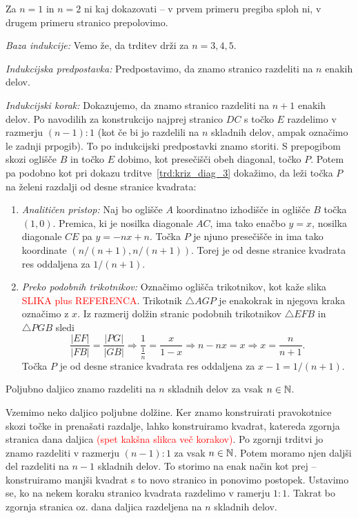 \begin{dokaz}
    Za $n = 1$ in $n = 2$ ni kaj dokazovati -- v prvem primeru pregiba sploh ni, v drugem primeru stranico prepolovimo.

    \textit{Baza indukcije:} Vemo že, da trditev drži za $n = 3, 4, 5$.

    \textit{Indukcijska predpostavka:} Predpostavimo, da znamo stranico razdeliti na $n$ enakih delov.

    \textit{Indukcijski korak:} Dokazujemo, da znamo stranico razdeliti na $n+1$ enakih delov. Po navodilih za konstrukcijo najprej stranico $DC$ s točko $E$ razdelimo v razmerju $(n-1):1$ (kot če bi jo razdelili na $n$ skladnih delov, ampak označimo le zadnji prpogib). To po indukcijski predpostavki znamo storiti. S prepogibom skozi oglišče $B$ in točko $E$ dobimo, kot presečišči obeh diagonal, točko $P$. Potem pa podobno kot pri dokazu trditve~\ref{trd:kriz_diag_3} dokažimo, da leži točka $P$ na želeni razdalji od desne stranice kvadrata:
    \begin{enumerate}
        \item \textit{Analitičen pristop:} Naj bo oglišče $A$ koordinatno izhodišče in oglišče $B$ točka $(1, 0)$. Premica, ki je nosilka diagonale $AC$, ima tako enačbo $y = x$, nosilka diagonale $CE$ pa $y = -nx + n$. Točka $P$ je njuno presečišče in ima tako koordinate $(n/(n+1), n/(n+1))$. Torej je od desne stranice kvadrata res oddaljena za $1/(n+1)$.
        \item \textit{Preko podobnih trikotnikov:} Označimo oglišča trikotnikov, kot kaže slika \textcolor{red}{SLIKA plus REFERENCA}. Trikotnik $\triangle AGP$ je enakokrak in njegova kraka označimo z $x$. Iz razmerij dolžin stranic podobnih trikotnikov $\triangle EFB$ in $\triangle PGB$ sledi
        $$ \frac{|EF|}{|FB|} = \frac{|PG|}{|GB|} \Rightarrow \frac{1}{\frac{1}{n}} = \frac{x}{1 - x} \Rightarrow n - nx = x \Rightarrow x = \frac{n}{n+1}. $$
        Točka $P$ je od desne stranice kvadrata res oddaljena za $x - 1 = 1/(n + 1)$.
    \end{enumerate}

\end{dokaz}

\begin{posledica}
    Poljubno daljico znamo razdeliti na $n$ skladnih delov za vsak $n \in \mathbb N$.
\end{posledica}

\begin{dokaz}
    Vzemimo neko daljico poljubne dolžine. Ker znamo konstruirati pravokotnice skozi točke in prenašati razdalje, lahko konstruiramo kvadrat, katereda zgornja stranica dana daljica \textcolor{red}{(spet kakšna slikca več korakov)}. Po zgornji trditvi jo znamo razdeliti v razmerju $(n-1) : 1$ za vsak $n \in \mathbb N$. Potem moramo njen daljši del razdeliti na $n-1$ skladnih delov. To storimo na enak način kot prej -- konstruiramo manjši kvadrat s to novo stranico in ponovimo postopek. Ustavimo se, ko na nekem koraku stranico kvadrata razdelimo v ramerju $1:1$. Takrat bo zgornja stranica oz. dana daljica razdeljena na $n$ skladnih delov.
\end{dokaz}

